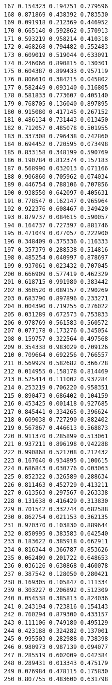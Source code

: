 \documentclass[
  10pt,
  a4paper,oneside]{article}
\begin{document}
\begin{verbatim}
167 0.154323 0.194751 0.779596
168 0.871869 0.438392 0.783530
169 0.091918 0.212369 0.446952
170 0.665140 0.592862 0.570913
171 0.593219 0.958214 0.410318
172 0.468268 0.794482 0.552483
173 0.609019 0.519044 0.633091
174 0.246066 0.890815 0.130301
175 0.604387 0.899433 0.957119
176 0.806610 0.384215 0.045802
177 0.582449 0.093140 0.316805
178 0.581833 0.773607 0.405140
179 0.768705 0.136040 0.897895
180 0.915080 0.417145 0.267152
181 0.486134 0.731443 0.013450
182 0.712057 0.485078 0.501955
183 0.337308 0.796438 0.742860
184 0.694452 0.720595 0.073498
185 0.833158 0.348199 0.590769
186 0.190784 0.812374 0.157183
187 0.568990 0.032013 0.071166
188 0.906860 0.705962 0.074034
189 0.446754 0.788106 0.707856
190 0.938550 0.642097 0.405631
191 0.778547 0.162147 0.965964
192 0.922376 0.608467 0.349420
193 0.879737 0.084615 0.590057
194 0.164737 0.727397 0.881746
195 0.471049 0.077057 0.222900
196 0.348409 0.375336 0.116333
197 0.357379 0.288538 0.514816
198 0.485254 0.040997 0.878697
199 0.937061 0.023432 0.707045
200 0.666909 0.577419 0.462329
201 0.618715 0.991980 0.383442
202 0.360520 0.089157 0.290269
203 0.683790 0.897896 0.233271
204 0.004390 0.719255 0.276022
205 0.031289 0.672573 0.753833
206 0.978769 0.561583 0.560572
207 0.077178 0.173276 0.345054
208 0.159757 0.322564 0.497568
209 0.354338 0.983029 0.709126
210 0.709664 0.692256 0.766557
211 0.569929 0.582682 0.366728
212 0.014955 0.158178 0.814469
213 0.525414 0.111002 0.937284
214 0.253219 0.706220 0.958351
215 0.890473 0.686402 0.104159
216 0.453425 0.001418 0.927685
217 0.845441 0.334265 0.396624
218 0.609038 0.727290 0.882402
219 0.567867 0.446613 0.568873
220 0.911370 0.285899 0.513061
221 0.937211 0.896198 0.942288
222 0.990868 0.521708 0.212432
223 0.167640 0.934895 0.100615
224 0.686843 0.030776 0.003063
225 0.852322 0.326589 0.288634
226 0.811463 0.452729 0.413211
227 0.613563 0.297567 0.263338
228 0.131638 0.416429 0.313830
229 0.701542 0.332744 0.682588
230 0.862754 0.021153 0.362135
231 0.970370 0.103830 0.889644
232 0.850995 0.383583 0.642540
233 0.183622 0.385918 0.662911
234 0.816344 0.366787 0.853626
235 0.062409 0.201722 0.648653
236 0.036126 0.630868 0.460078
237 0.387542 0.128050 0.280421
238 0.169305 0.105847 0.111334
239 0.303227 0.206892 0.512309
240 0.054538 0.385813 0.824036
241 0.243194 0.723816 0.154143
242 0.760294 0.879300 0.433157
243 0.111106 0.749180 0.495129
244 0.423188 0.324282 0.137001
245 0.995503 0.282988 0.738398
246 0.980973 0.987139 0.094077
247 0.285519 0.602009 0.042384
248 0.289431 0.013343 0.475179
249 0.076984 0.478115 0.175830
250 0.807755 0.483600 0.631798

\end{verbatim}
\end{document}
